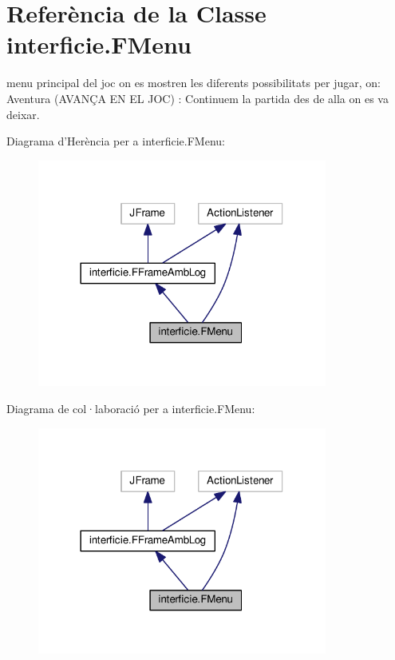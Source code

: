 \hypertarget{classinterficie_1_1_f_menu}{\section{Referència de la Classe interficie.\+F\+Menu}
\label{classinterficie_1_1_f_menu}
}


menu principal del joc on es mostren les diferents possibilitats per jugar, on\+: Aventura (A\+V\+A\+NÇ\+A E\+N E\+L J\+O\+C) \+: Continuem la partida des de alla on es va deixar.  




Diagrama d'Herència per a interficie.\+F\+Menu\+:\nopagebreak
\begin{figure}[H]
\begin{center}
\leavevmode
\includegraphics[width=270pt]{classinterficie_1_1_f_menu__inherit__graph}
\end{center}
\end{figure}


Diagrama de col·laboració per a interficie.\+F\+Menu\+:\nopagebreak
\begin{figure}[H]
\begin{center}
\leavevmode
\includegraphics[width=270pt]{classinterficie_1_1_f_menu__coll__graph}
\end{center}
\end{figure}

